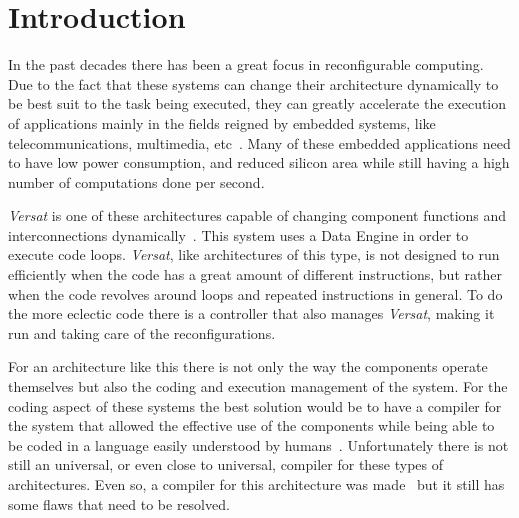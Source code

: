 
\chapter{Introduction}
\label{chapter:introducao}

In the past decades there has been a great focus in reconfigurable computing.
Due to the fact that these systems can change their architecture dynamically to
be best suit to the task being executed, they can greatly accelerate the
execution of applications mainly in the fields reigned by embedded systems, like
telecommunications, multimedia, etc~\cite{Carta06,Liu15,Lee18TACO}.  Many of
these embedded applications need to have low power consumption, and reduced
silicon area while still having a high number of computations done per second.

{\it Versat} is one of these architectures capable of changing component
functions and interconnections dynamically~\cite{Lopes16}.  This system uses a
Data Engine in order to execute code loops. {\it Versat}, like architectures of
this type, is not designed to run efficiently when the code has a great amount
of different instructions, but rather when the code revolves around loops and
repeated instructions in general.  To do the more eclectic code there is a
controller that also manages {\it Versat}, making it run and taking care of the
reconfigurations.

For an architecture like this there is not only the way the components operate
themselves but also the coding and execution management of the system.  For the
coding aspect of these systems the best solution would be to have a compiler for
the system that allowed the effective use of the components while being able to
be coded in a language easily understood by humans~\cite{Koeplinger18PLDI}.
Unfortunately there is not still an universal, or even close to universal,
compiler for these types of architectures. Even so, a compiler for this
architecture was made~\cite{Santiago2016} but it still has some flaws that need
to be resolved.

